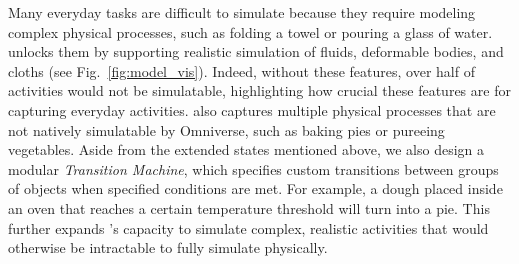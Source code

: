 
Many everyday tasks are difficult to simulate because they require modeling complex physical processes, such as folding a towel or pouring a glass of water. \simulator unlocks them by supporting realistic simulation of fluids, deformable bodies, and cloths (see Fig.~\ref{fig:model_vis}). Indeed, without these features, over half of \benchmark activities would not be simulatable, highlighting how crucial these features are for capturing everyday activities. \simulator also captures multiple physical processes that are not natively simulatable by Omniverse, such as baking pies or pureeing vegetables. Aside from the extended states mentioned above, we also design a modular \textit{Transition Machine}, which specifies custom transitions between groups of objects when specified conditions are met. For example, a dough placed inside an oven that reaches a certain temperature threshold will turn into a pie. This further expands \simulator's capacity to simulate complex, realistic activities that would otherwise be intractable to fully simulate physically.




